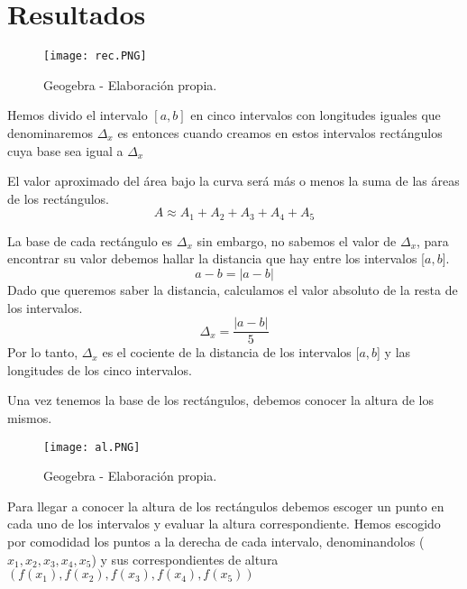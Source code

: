 \documentclass[twocolumn]{article}
\begin{document}
\section{Resultados}
\begin{figure}[H]
  \centering
  \texttt{[image: rec.PNG]}
  \caption{Geogebra - Elaboración propia.}  
\end{figure}

\begin{justify}
  Hemos divido el intervalo \([a,b]\) en cinco intervalos con longitudes iguales que denominaremos \(\Delta _x\) es entonces cuando creamos en estos intervalos rectángulos cuya base sea igual a \(\Delta_x\)
\end{justify}

\begin{justify}
  El valor aproximado del área bajo la curva será más o menos la suma de las áreas de los rectángulos. \[A \approx A_1 + A_2 +A_3 +A_4 +A_5 \]
\end{justify}
\begin{justify}
  La base de cada rectángulo es \(\Delta_x\) sin embargo, no sabemos el valor de \(\Delta_x\), para encontrar su valor debemos hallar la distancia que hay entre los intervalos [\(a,b\)]. \[a - b = |a-b| \] Dado que queremos saber la distancia, calculamos el valor absoluto de la resta de los intervalos.
 \[\Delta_x = \frac{|a-b| }{5}\] Por lo tanto, \(\Delta_x\) es el cociente de la distancia de los intervalos [\(a,b\)] y las longitudes de los cinco intervalos.
\end{justify}

\begin{justify}
  Una vez tenemos la base de los rectángulos, debemos conocer la altura de los mismos.  
\end{justify}

\begin{figure}[H]
  \centering
  \texttt{[image: al.PNG]}
  \caption{Geogebra - Elaboración propia.}  
\end{figure}

\begin{justify}
  Para llegar a conocer la altura de los rectángulos debemos escoger un punto en cada uno de los intervalos y evaluar la altura correspondiente. Hemos escogido por comodidad los puntos a la derecha de cada intervalo, denominandolos (\(x_1,x_2,x_3,x_4,x_5\)) y sus correspondientes de altura  \(\left(f(x_1),f(x_2),f(x_3),f(x_4),f(x_5)\right)\)
\end{justify}
\end{document}

